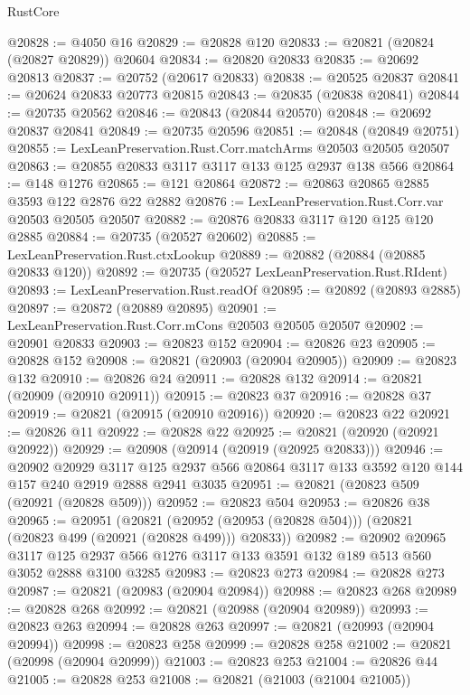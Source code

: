 \begin{lexlean}{RustCore}
\begin{coremodule}
@20828 := @4050 @16
@20829 := @20828 @120
@20833 := @20821 (@20824 (@20827 @20829)) @20604
@20834 := @20820 @20833
@20835 := @20692 @20813
@20837 := @20752 (@20617 @20833)
@20838 := @20525 @20837
@20841 := @20624 @20833 @20773 @20815
@20843 := @20835 (@20838 @20841)
@20844 := @20735 @20562
@20846 := @20843 (@20844 @20570)
@20848 := @20692 @20837 @20841
@20849 := @20735 @20596
@20851 := @20848 (@20849 @20751)
@20855 := LexLeanPreservation.Rust.Corr.matchArms @20503 @20505 @20507
@20863 := @20855 @20833 @3117 @3117 @133 @125 @2937 @138 @566
@20864 := @148 @1276
@20865 := @121 @20864
@20872 := @20863 @20865 @2885 @3593 @122 @2876 @22 @2882
@20876 := LexLeanPreservation.Rust.Corr.var @20503 @20505 @20507
@20882 := @20876 @20833 @3117 @120 @125 @120 @2885
@20884 := @20735 (@20527 @20602)
@20885 := LexLeanPreservation.Rust.ctxLookup
@20889 := @20882 (@20884 (@20885 @20833 @120))
@20892 := @20735 (@20527 LexLeanPreservation.Rust.RIdent)
@20893 := LexLeanPreservation.Rust.readOf
@20895 := @20892 (@20893 @2885)
@20897 := @20872 (@20889 @20895)
@20901 := LexLeanPreservation.Rust.Corr.mCons @20503 @20505 @20507
@20902 := @20901 @20833
@20903 := @20823 @152
@20904 := @20826 @23
@20905 := @20828 @152
@20908 := @20821 (@20903 (@20904 @20905))
@20909 := @20823 @132
@20910 := @20826 @24
@20911 := @20828 @132
@20914 := @20821 (@20909 (@20910 @20911))
@20915 := @20823 @37
@20916 := @20828 @37
@20919 := @20821 (@20915 (@20910 @20916))
@20920 := @20823 @22
@20921 := @20826 @11
@20922 := @20828 @22
@20925 := @20821 (@20920 (@20921 @20922))
@20929 := @20908 (@20914 (@20919 (@20925 @20833)))
@20946 := @20902
    @20929
    @3117
    @125
    @2937
    @566
    @20864
    @3117
    @133
    @3592
    @120
    @144
    @157
    @240
    @2919
    @2888
    @2941
    @3035
@20951 := @20821 (@20823 @509 (@20921 (@20828 @509)))
@20952 := @20823 @504
@20953 := @20826 @38
@20965 := @20951
    (@20821 (@20952 (@20953 (@20828 @504))) (@20821 (@20823 @499 (@20921 (@20828 @499))) @20833))
@20982 := @20902
    @20965
    @3117
    @125
    @2937
    @566
    @1276
    @3117
    @133
    @3591
    @132
    @189
    @513
    @560
    @3052
    @2888
    @3100
    @3285
@20983 := @20823 @273
@20984 := @20828 @273
@20987 := @20821 (@20983 (@20904 @20984))
@20988 := @20823 @268
@20989 := @20828 @268
@20992 := @20821 (@20988 (@20904 @20989))
@20993 := @20823 @263
@20994 := @20828 @263
@20997 := @20821 (@20993 (@20904 @20994))
@20998 := @20823 @258
@20999 := @20828 @258
@21002 := @20821 (@20998 (@20904 @20999))
@21003 := @20823 @253
@21004 := @20826 @44
@21005 := @20828 @253
@21008 := @20821 (@21003 (@21004 @21005))

\end{coremodule}
\end{lexlean}
